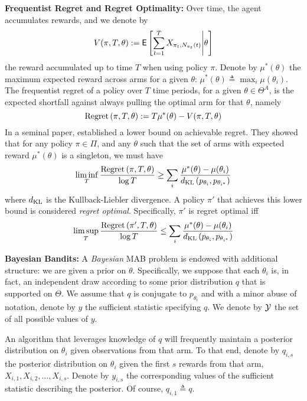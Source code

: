 \noindent\textbf{\textsf{Frequentist Regret and Regret Optimality:}} Over time, the agent accumulates rewards, and we denote by 
\[
V(\pi, T, \theta) := 
\mathsf{E} \left[
	\sum_{t=1}^T
	X_{
		\pi_t,
		N_{\pi_t}(t)
	}
\Bigg |
\theta
\right]
\] 
the reward accumulated up to time $T$ when using policy $\pi$. Denote by $\mu^*(\theta)$ the maximum expected reward across arms for a given $\theta$:  $\mu^*(\theta) \triangleq \max_i \mu(\theta_i)$. The frequentist regret of a policy over $T$ time periods, for a given $\theta \in \Theta^A$, is the expected shortfall against always pulling the optimal arm for that $\theta$, namely
\[
\textnormal{Regret} \left( \pi, T, \theta \right) := 
T \mu^*(\theta) -
V(\pi, T, \theta)
\]
In a seminal paper, \cite{lai1985asymptotically} established a lower bound on achievable regret. They showed that for any policy $\pi \in \Pi$, and any $\theta$ such that the set of arms with expected reward $\mu^*(\theta)$ is a singleton, we must have
\begin{equation}
\label{eq:lai_robbins_lb}
\liminf_T
\frac{
	\textnormal{Regret} \left( \pi, T, \theta \right)
}
{
	\log T
}
\geq
\sum_{i}
\frac{\mu^*(\theta) - \mu(\theta_i)}{d_{\rm KL}\left(p_{\theta_i},p_{\theta_{i^*}} \right)}
\end{equation}
where $d_{\rm KL}$ is the Kullback-Liebler divergence. A policy $\pi'$ that achieves this lower bound is considered {\em regret optimal}. Specifically, $\pi'$ is regret optimal iff 
\[
\limsup_T
\frac{
	\textnormal{Regret} \left( \pi', T, \theta \right)
}
{
	\log T
}
\leq
\sum_{i}
\frac{\mu^*(\theta) - \mu(\theta_i)}{d_{\rm KL}\left(p_{\theta_i},p_{\theta_{i^*}} \right)}
\]

\noindent\textbf{\textsf{Bayesian Bandits: }}A {\em Bayesian} MAB problem is endowed with additional structure: we are given a prior on $\theta$. Specifically, we suppose that each $\theta_i$ is, in fact, an independent draw according to some prior distribution $q$ that is supported on $\Theta$. We assume that $q$ is conjugate to $p_{\theta_i}$ and with a minor abuse of notation, denote by $y$ the sufficient statistic specifying $q$. We denote by $\mathcal Y$ the set of all possible values of $y$. 

An algorithm that leverages knowledge of $q$ will frequently maintain a posterior distribution on $\theta_i$ given observations from that arm. To that end, denote by $q_{i,s}$ the posterior distribution on $\theta_i$ given the first $s$ rewards from that arm, $X_{i,1},X_{i,2},\dots,X_{i,s}$. Denote by $y_{i,s}$ the corresponding values of the sufficient statistic describing the posterior. Of course, $q_{i,1} \triangleq q$. 

